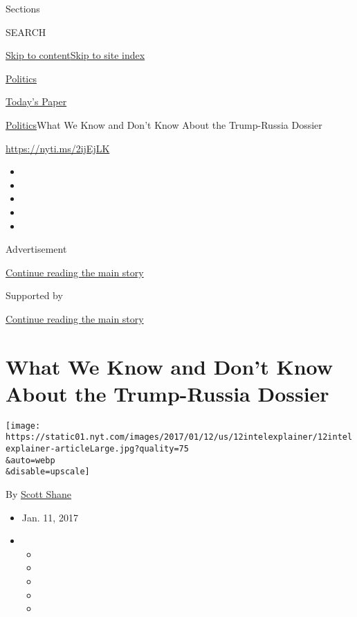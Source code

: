 Sections

SEARCH

\protect\hyperlink{site-content}{Skip to
content}\protect\hyperlink{site-index}{Skip to site index}

\href{https://www.nytimes.com/section/politics}{Politics}

\href{https://myaccount.nytimes.com/auth/login?response_type=cookie\&client_id=vi}{}

\href{https://www.nytimes.com/section/todayspaper}{Today's Paper}

\href{/section/politics}{Politics}\textbar{}What We Know and Don't Know
About the Trump-Russia Dossier

\url{https://nyti.ms/2ijEjLK}

\begin{itemize}
\item
\item
\item
\item
\item
\end{itemize}

Advertisement

\protect\hyperlink{after-top}{Continue reading the main story}

Supported by

\protect\hyperlink{after-sponsor}{Continue reading the main story}

\hypertarget{what-we-know-and-dont-know-about-the-trump-russia-dossier}{%
\section{What We Know and Don't Know About the Trump-Russia
Dossier}\label{what-we-know-and-dont-know-about-the-trump-russia-dossier}}

\texttt{[image: https://static01.nyt.com/images/2017/01/12/us/12intelexplainer/12intelexplainer-articleLarge.jpg?quality=75\\\&auto=webp\\\&disable=upscale]}

By \href{http://www.nytimes.com/by/scott-shane}{Scott Shane}

\begin{itemize}
\item
  Jan. 11, 2017
\item
  \begin{itemize}
  \item
  \item
  \item
  \item
  \item
  \end{itemize}
\end{itemize}

